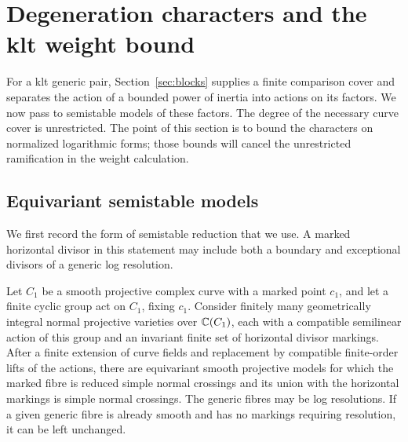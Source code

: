 \section{Degeneration characters and the klt weight bound}
\label{sec:degeneration}

For a klt generic pair, Section~\ref{sec:blocks} supplies a finite
comparison cover and separates the action of a bounded power of inertia
into actions on its factors. We now pass to semistable models of these
factors. The degree of the necessary curve cover is unrestricted.
The point of this section is to bound the characters on normalized
logarithmic forms; those bounds will cancel the unrestricted ramification
in the weight calculation.

\subsection{Equivariant semistable models}

We first record the form of semistable reduction that we use. A marked
horizontal divisor in this statement may include both a boundary and
exceptional divisors of a generic log resolution.

\begin{lemma}\label{lem:marked-semistable}
Let $C_1$ be a smooth projective complex curve with a marked point $c_1$,
and let a finite cyclic group act on $C_1$, fixing $c_1$.
Consider finitely many geometrically integral normal projective varieties
over $\mathbb C(C_1)$, each with a compatible semilinear action of this group
and an invariant finite set of horizontal divisor markings.
After a finite extension of curve fields and replacement by compatible
finite-order lifts of the actions, there are equivariant smooth
projective models for which the marked fibre is reduced simple normal
crossings and its union with the horizontal markings is simple normal
crossings. The generic fibres may be log resolutions.
If a given generic fibre is already smooth and has no markings requiring
resolution, it can be left unchanged.
\end{lemma}

